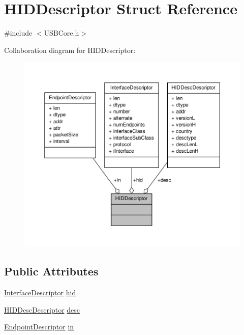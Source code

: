 \hypertarget{struct_h_i_d_descriptor}{\section{H\-I\-D\-Descriptor Struct Reference}
\label{struct_h_i_d_descriptor}
}


{\ttfamily \#include $<$U\-S\-B\-Core.\-h$>$}



Collaboration diagram for H\-I\-D\-Descriptor\-:
\nopagebreak
\begin{figure}[H]
\begin{center}
\leavevmode
\includegraphics[width=350pt]{struct_h_i_d_descriptor__coll__graph}
\end{center}
\end{figure}
\subsection*{Public Attributes}
\begin{DoxyCompactItemize}
\item 
\hyperlink{struct_interface_descriptor}{Interface\-Descriptor} \hyperlink{struct_h_i_d_descriptor_ae72a473536f32b7e6cab5537ea9941e0}{hid}
\item 
\hyperlink{struct_h_i_d_desc_descriptor}{H\-I\-D\-Desc\-Descriptor} \hyperlink{struct_h_i_d_descriptor_a3e8631944ed908ad2f8b36685b689a87}{desc}
\item 
\hyperlink{struct_endpoint_descriptor}{Endpoint\-Descriptor} \hyperlink{struct_h_i_d_descriptor_acc38a209fa31af987724b82b48a669ff}{in}
\end{DoxyCompactItemize}


